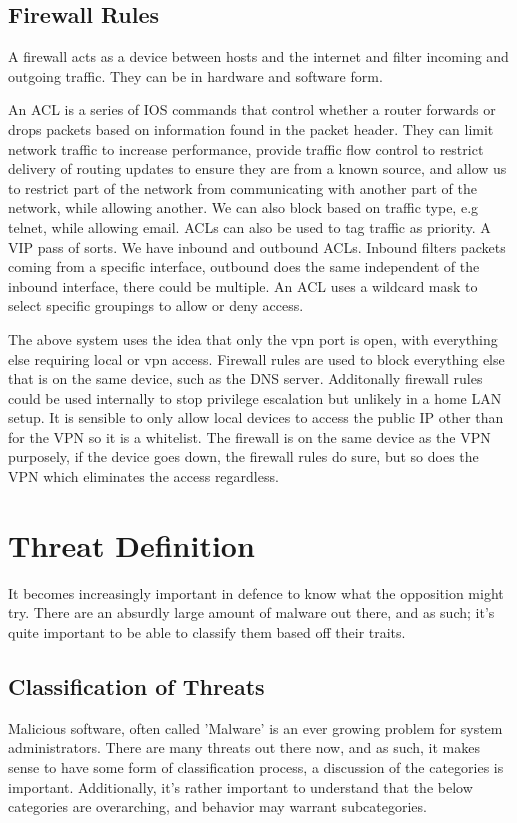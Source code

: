 \subsection{Firewall Rules}
A firewall acts as a device between hosts and the internet and filter incoming and outgoing traffic. They can be in hardware and software form.

An ACL is a series of IOS commands that control whether a router forwards or drops packets based on information found in the packet header. They can limit network traffic to increase performance, provide traffic flow control to restrict delivery of routing updates to 
ensure they are from a known source, and allow us to restrict part of the network from communicating with another part of the network, while allowing another. We can also block based on traffic type, e.g telnet, while allowing email. ACLs can also be used to tag traffic as priority. 
A VIP pass of sorts. We have inbound and outbound ACLs. Inbound filters packets coming from a specific interface, outbound does the same independent of the inbound interface, there could be multiple. An ACL uses a wildcard mask to select specific groupings to allow or deny access.

The above system uses the idea that only the vpn port is open, with everything else requiring local or vpn access. Firewall rules are used to block everything else that is on the same device, such as the DNS server. Additonally firewall rules could be used internally to stop privilege escalation 
but unlikely in a home LAN setup. It is sensible to only allow local devices to access the public IP other than for the VPN so it is a whitelist. The firewall is on the same device as the VPN purposely, if the device goes down, the firewall rules do sure, but so does the VPN which eliminates the access regardless.


\section{Threat Definition}
It becomes increasingly important in defence to know what the opposition might try. There are an absurdly large amount of malware out there, and as such; it's quite important to be able to classify them based off their traits.

\subsection{Classification of Threats}
Malicious software, often called 'Malware' is an ever growing problem for system administrators. There are many threats out there now, and as such, it makes sense to have some form of classification process, a discussion of the categories is 
important. Additionally, it's rather important to understand that the below categories are overarching, and behavior may warrant subcategories. \citep{MalwareClass} 

